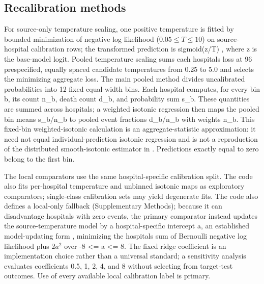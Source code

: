 \documentclass[11pt]{article}
\begin{document}
\subsection*{Recalibration methods}\label{recalibration-methods}

For source-only temperature scaling, one positive temperature is fitted by bounded minimization of negative log likelihood ($0.05\le T\le 10$) on source-hospital calibration rows; the transformed prediction is sigmoid(z/T) \cite{r15}, where z is the base-model logit. Pooled temperature scaling sums each hospital\textquotesingle s loss at 96 prespecified, equally spaced candidate temperatures from 0.25 to 5.0 and selects the minimizing aggregate loss. The main pooled method divides uncalibrated probabilities into 12 fixed equal-width bins. Each hospital computes, for every bin b, its count n\_b, death count d\_b, and probability sum s\_b. These quantities are summed across hospitals; a weighted isotonic regression then maps the pooled bin means s\_b/n\_b to pooled event fractions d\_b/n\_b with weights n\_b. This fixed-bin weighted-isotonic calculation is an aggregate-statistic approximation: it need not equal individual-prediction isotonic regression and is not a reproduction of the distributed smooth-isotonic estimator in \cite{r4}. Predictions exactly equal to zero belong to the first bin.

The local comparators use the same hospital-specific calibration split. The code also fits per-hospital temperature and unbinned isotonic maps as exploratory comparators; single-class calibration sets may yield degenerate fits. The code also defines a local-only fallback (Supplementary Methods); because it can disadvantage hospitals with zero events, the primary comparator instead updates the source-temperature model by a hospital-specific intercept a, an established model-updating form \cite{r17}, minimizing the hospital\textquotesingle s sum of Bernoulli negative log likelihood plus $2a^2$ over -8 \textless= a \textless= 8. The fixed ridge coefficient is an implementation choice rather than a universal standard; a sensitivity analysis evaluates coefficients 0.5, 1, 2, 4, and 8 without selecting from target-test outcomes. Use of every available local calibration label is primary.
\end{document}
